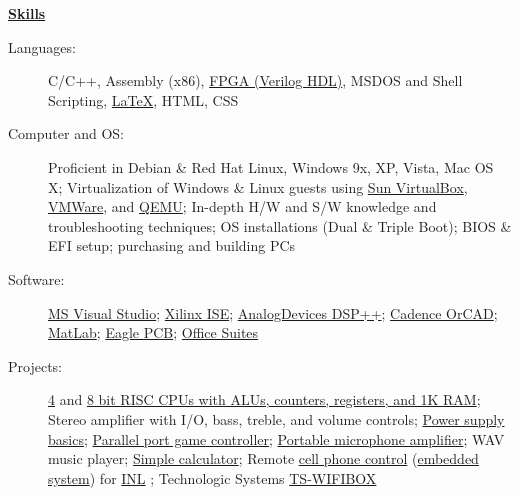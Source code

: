 \documentclass[letterpaper,11pt]{article}
\newcommand{\resheading}[1]{{\large \colorbox{mygrey}{\begin{minipage}{\textwidth}{\textbf{#1 \vphantom{p\^{E}}}}\end{minipage}}}}
\begin{document}
\resheading{\href{http://www.derekhildreth.com/portfolio.php}{Skills}}
  \begin{description}
    \item[Languages:] { \footnotesize C/C++, Assembly (x86), \href{http://www.latticesemi.com/products/designsoftware/isplever/ispleverstarter/index.cfm}{FPGA (Verilog HDL)}, MSDOS and Shell Scripting, \href{http://www.latex-project.org/}{\LaTeX}}, HTML, CSS
    \item[Computer and OS:] { \footnotesize Proficient in Debian \& Red Hat Linux, Windows 9x, XP, Vista, Mac OS X; Virtualization of Windows \& Linux guests using \href{http://www.virtualbox.org}{Sun VirtualBox}, \href{http://www.vmware.com}{VMWare}, and \href{http://www.qemu.com}{QEMU}; In-depth H/W and S/W knowledge and troubleshooting techniques;  OS installations (Dual \& Triple Boot);  BIOS \& EFI setup; purchasing and building PCs }
    \item[Software:]{\footnotesize \href{http://msdn.microsoft.com/en-us/library/ms950416.aspx}{MS Visual Studio}; \href{http://www.xilinx.com/tools/designtools.htm}{Xilinx ISE}; \href{http://www.analog.com}{AnalogDevices DSP++}; \href{http://www.cadence.com/products/orcad/Pages/default_test.aspx}{Cadence OrCAD}; \href{http://www.matlab.com}{MatLab}; \href{http://www.cadsoft.de/}{Eagle PCB}; \href{http://www.openoffice.org/}{Office Suites}}  
    \item[Projects:] { \footnotesize 
\href{http://www.derekhildreth.com/portfolio/Computer_Engineering/4-Bit_CPU_Fundamental_Digital_Systems_CompE224.zip}{4} 
and 
\href{http://www.derekhildreth.com/portfolio/Computer_Engineering/8-Bit_CPU_Comp_Architecture_CompE324.pdf}{8 bit RISC CPUs with ALUs, counters, registers, and 1K RAM}; 
Stereo amplifier with I/O, bass, treble, and volume controls; 
\href{http://www.derekhildreth.com/portfolio/Computer_Engineering/Zener_Diode_Power_Supply_Basics_Electrics_Devices_and_Circtuits_CompE350.pdf}{Power supply basics}; 
\href{http://www.derekhildreth.com/portfolio/Computer_Engineering/BZFlag_Game_Controller_Computer_IO_CompE360.pdf}{Parallel port game controller}; 
\href{http://www.derekhildreth.com/portfolio/Computer_Engineering/Microphone_Preamplifier_Electrics_Devices_and_Circuits_CompE350.pdf}{Portable microphone amplifier}; 
WAV music player; 
\href{http://www.derekhildreth.com/portfolio/Computer_Engineering/Simple_Calculator_Verilog_Digital_Systems_Design_CompE340.pdf}{Simple calculator}; 
Remote \href{http://emp.byui.edu/smithk/compe499_s09/teamwork/default.htm}{cell phone control} (\href{http://www.embeddedarm.com/products/board-detail.php?product=TS-7350}{embedded system}) for \href{http://www.inl.gov}{INL} ; Technologic Systems \href{http://www.embeddedarm.com/products/board-detail.php?product=TS-WIFIBOX}{TS-WIFIBOX}}
  \end{description} %
\end{document}
